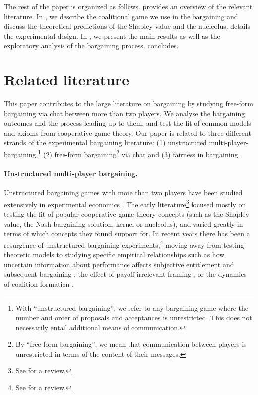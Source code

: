 
The rest of the paper is organized as follows.  provides an overview of the relevant literature. In , we describe the coalitional game we use in the bargaining and discuss the theoretical predictions of the Shapley value and the nucleolus.  details the experimental design. In , we present the main results as well as the exploratory analysis of the bargaining process.  concludes.



\section{Related literature} \label{sec:literature}
This paper contributes to the large literature on bargaining by studying free-form bargaining via chat between more than two players. We analyze the bargaining outcomes and the process leading up to them, and test the fit of common models and axioms from cooperative game theory. Our paper is related to three different strands of the experimental bargaining literature: (1) unstructured multi-player-bargaining,\footnote{With ``unstructured bargaining'', we refer to any bargaining game where the number and order of proposals and acceptances is unrestricted. This does not necessarily entail additional means of communication.} (2) free-form bargaining\footnote{By ``free-form bargaining'', we mean that communication between players is unrestricted in terms of the content of their messages.} via chat and (3) fairness in bargaining. 


\paragraph{Unstructured multi-player bargaining.}

Unstructured bargaining games with more than two players have been studied extensively in experimental economics \parencite[e.g.][]{Kalischetal1952, Maschler1965, NydeggerOwen1974, RapoportKahan1976, MurnighanRoth1978, Micheneretal1979, RothMalouf1979, KomoritaHamiltonKravitz1984, LeopoldWildburger1992}. The early literature\footnote{See \cite{Roth1995} for a review.} focused mostly on testing the fit of popular cooperative game theory concepts (such as the Shapley value, the Nash bargaining solution, kernel or nucleolus), and varied greatly in terms of which concepts they found support for. In recent years there has been a resurgence of unstructured bargaining experiments,\footnote{See \cite{karagozouglu2019going} for a review.} moving away from testing theoretic models to studying specific empirical relationships such as how uncertain information about performance affects subjective entitlement and subsequent bargaining \parencite{KaragözoğluRiedl2015}, the effect of payoff-irrelevant framing \parencite{Isonietal2014}, or the dynamics of coalition formation \parencite{TremewanVanberg2016}.

